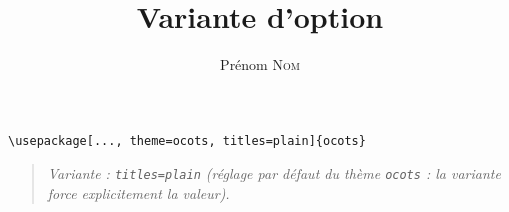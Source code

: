 \documentclass[11pt]{ocots-book}
\title{Variante d'option}
\author{Prénom \textsc{Nom}}
\newcommand{\ocotsvariantnote}[1]{\begin{quote}\itshape Variante : #1\end{quote}}
\begin{document}
\maketitle

\begin{lstlisting}
\usepackage[..., theme=ocots, titles=plain]{ocots}
\end{lstlisting}
\ocotsvariantnote{\texttt{titles=plain} (r\'eglage par d\'efaut du th\`eme \texttt{ocots} : la variante force explicitement la valeur).}

\end{document}
